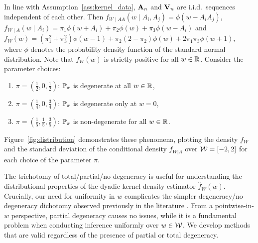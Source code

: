In line with Assumption~\ref{ass:kernel_data}, $\bA_n$ and $\bV_n$ are i.i.d.\
sequences independent of each other. Then
$f_{W \mid AA}(w \mid A_i, A_j) = \phi(w - A_i A_j)$,\,
$f_{W \mid A}(w \mid A_i) = \pi_1 \phi(w + A_i) + \pi_2 \phi(w)
+ \pi_3 \phi(w - A_i)$ and
$f_W(w) = (\pi_1^2 + \pi_3^2) \phi(w-1) + \pi_2 (2 - \pi_2) \phi(w) + 2
\pi_1 \pi_3 \phi(w+1),$
where $\phi$ denotes the probability density function of the standard normal
distribution. Note that $f_W(w)$ is strictly positive for all $w \in \R$.
Consider the parameter choices:
%
\begin{enumerate}[label=(\roman*)]

  \item $\pi = \left( \frac{1}{2}, 0, \frac{1}{2} \right)$:\quad
    $\P_\pi$ is degenerate at all $w \in \R$,

  \item $\pi = \left( \frac{1}{4}, 0, \frac{3}{4} \right)$:\quad
    $\P_\pi$ is degenerate only at $w=0$,

  \item $\pi = \left( \frac{1}{5}, \frac{1}{5}, \frac{3}{5} \right)$:\quad
    $\P_\pi$ is non-degenerate for all $w \in \R$.

\end{enumerate}
%
Figure~\ref{fig:distribution} demonstrates these phenomena, plotting the
density $f_W$ and the standard deviation of the conditional
density $f_{W|A}$ over $\cW = [-2,2]$ for each choice of the parameter $\pi$.

The trichotomy of total/partial/no  degeneracy is useful for understanding the
distributional properties of the dyadic kernel density estimator
$\hat{f}_W(w)$. Crucially, our need for uniformity in $w$ complicates the
simpler degeneracy/no degeneracy dichotomy observed previously in the
literature \citep{graham2024kernel}. From a pointwise-in-$w$
perspective, partial degeneracy causes no issues, while it is a fundamental
problem when conducting inference uniformly over $w \in \cW$. We develop
methods that are valid regardless of the presence of partial or total
degeneracy.

